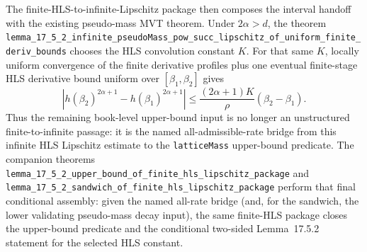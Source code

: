 \documentclass[a4paper,11pt]{article}
\begin{document}
The finite-HLS-to-infinite-Lipschitz package then composes the interval
handoff with the existing pseudo-mass MVT theorem.  Under \(2\alpha>d\), the
theorem
\texttt{lemma\_17\_5\_2\_infinite\_pseudoMass\_pow\_succ\_lipschitz\_of\_uniform\_finite\_deriv\_bounds}
chooses the HLS convolution constant \(K\).  For that same \(K\), locally
uniform convergence of the finite derivative profiles plus one eventual
finite-stage HLS derivative bound uniform over \([\beta_1,\beta_2]\) gives
\[
  |h(\beta_2)^{2\alpha+1}-h(\beta_1)^{2\alpha+1}|
  \le \frac{(2\alpha+1)K}{\rho}(\beta_2-\beta_1).
\]
Thus the remaining book-level upper-bound input is no longer an unstructured
finite-to-infinite passage: it is the named all-admissible-rate bridge from
this infinite HLS Lipschitz estimate to the \texttt{latticeMass} upper-bound
predicate.  The companion theorems
\texttt{lemma\_17\_5\_2\_upper\_bound\_of\_finite\_hls\_lipschitz\_package}
and
\texttt{lemma\_17\_5\_2\_sandwich\_of\_finite\_hls\_lipschitz\_package}
perform that final conditional assembly: given the named all-rate bridge (and,
for the sandwich, the lower validating pseudo-mass decay input), the same
finite-HLS package closes the upper-bound predicate and the conditional
two-sided Lemma~17.5.2 statement for the selected HLS constant.
\end{document}
